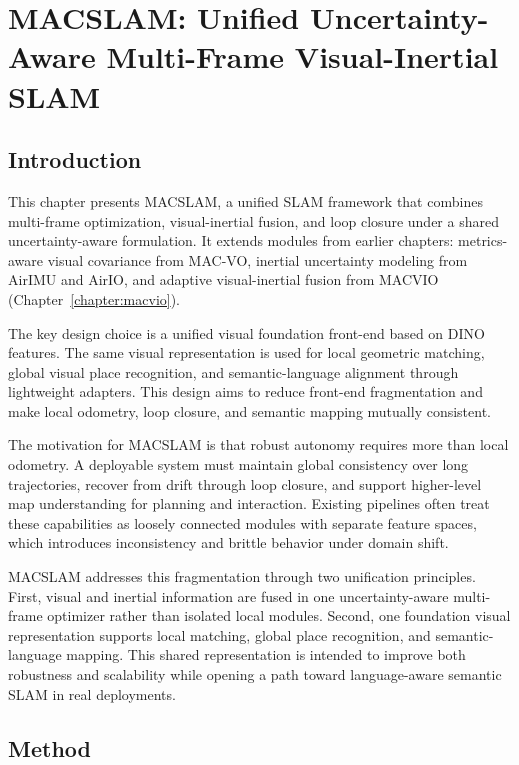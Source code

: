 \chapter{MACSLAM: Unified Uncertainty-Aware Multi-Frame Visual-Inertial SLAM} \label{chapter:macslam}

\section{Introduction}

This chapter presents MACSLAM, a unified SLAM framework that combines multi-frame optimization, visual-inertial fusion, and loop closure under a shared uncertainty-aware formulation.
It extends modules from earlier chapters: metrics-aware visual covariance from MAC-VO, inertial uncertainty modeling from AirIMU and AirIO, and adaptive visual-inertial fusion from MACVIO (Chapter~\ref{chapter:macvio}).

The key design choice is a unified visual foundation front-end based on DINO features.
The same visual representation is used for local geometric matching, global visual place recognition, and semantic-language alignment through lightweight adapters.
This design aims to reduce front-end fragmentation and make local odometry, loop closure, and semantic mapping mutually consistent.

The motivation for MACSLAM is that robust autonomy requires more than local odometry.
A deployable system must maintain global consistency over long trajectories, recover from drift through loop closure, and support higher-level map understanding for planning and interaction.
Existing pipelines often treat these capabilities as loosely connected modules with separate feature spaces, which introduces inconsistency and brittle behavior under domain shift.

MACSLAM addresses this fragmentation through two unification principles.
First, visual and inertial information are fused in one uncertainty-aware multi-frame optimizer rather than isolated local modules.
Second, one foundation visual representation supports local matching, global place recognition, and semantic-language mapping.
This shared representation is intended to improve both robustness and scalability while opening a path toward language-aware semantic SLAM in real deployments.

\section{Method}
\label{sec:macslam:method}

